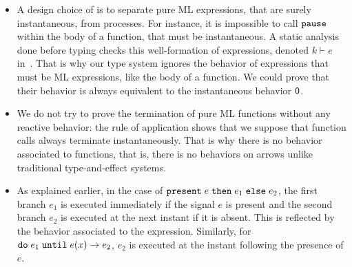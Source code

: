 \documentclass[9pt,preprint]{sigplanconf}
\begin{document}
\begin{itemize}

\item A design choice of \rml{} is to separate pure ML expressions, that are surely instantaneous, from processes. For instance, it is impossible to call $\mathtt{pause}$ within the body of a function, that must be instantaneous. A static analysis done before typing checks this well-formation of expressions, denoted $k \vdash e$ in~\cite{Mandel:2005}. That is why our type system ignores the behavior of expressions that must be ML expressions, like the body of a function. We could prove that their behavior is always equivalent to the instantaneous behavior $\textsf{0}$.


\item We do not try to prove the termination of pure ML functions without any reactive behavior: the rule of application shows that we suppose that function calls always terminate instantaneously. That is why there is no behavior associated to functions, that is, there is no behaviors on arrows unlike traditional type-and-effect systems.

\item As explained earlier, in the case of $\mathtt{present}\; e \;\mathtt{then}\; e_1 \;\mathtt{else}\; e_2$, the first branch $e_1$ is executed immediately if the signal $e$ is present and the second branch $e_2$ is executed at the next instant if it is absent. This is reflected by the behavior associated to the expression. Similarly, for $\mathtt{do}\; e_1 \;\mathtt{until}\; e(x) \rightarrow e_2$, $e_2$ is executed at the instant following the presence of $e$.


\end{itemize}
\end{document}
